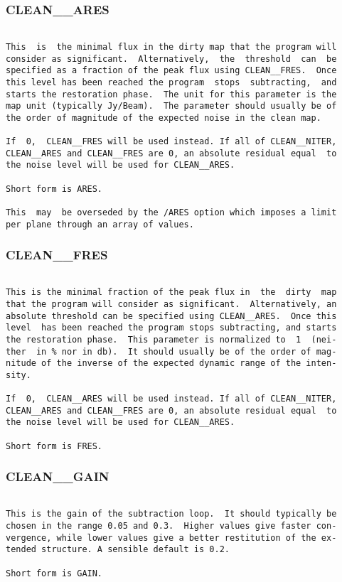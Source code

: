 \subsubsection{CLEAN\_\_ARES}
\begin{verbatim}

This  is  the minimal flux in the dirty map that the program will
consider as significant.  Alternatively,  the  threshold  can  be
specified as a fraction of the peak flux using CLEAN__FRES.  Once
this level has been reached the program  stops  subtracting,  and
starts the restoration phase.  The unit for this parameter is the
map unit (typically Jy/Beam).  The parameter should usually be of
the order of magnitude of the expected noise in the clean map.

If  0,  CLEAN__FRES will be used instead. If all of CLEAN__NITER,
CLEAN__ARES and CLEAN__FRES are 0, an absolute residual equal  to
the noise level will be used for CLEAN__ARES.

Short form is ARES.

This  may  be overseded by the /ARES option which imposes a limit
per plane through an array of values.

\end{verbatim}
\subsubsection{CLEAN\_\_FRES}
\begin{verbatim}

This is the minimal fraction of the peak flux in  the  dirty  map
that the program will consider as significant.  Alternatively, an
absolute threshold can be specified using CLEAN__ARES.  Once this
level  has been reached the program stops subtracting, and starts
the restoration phase.  This parameter is normalized to  1  (nei-
ther  in % nor in db).  It should usually be of the order of mag-
nitude of the inverse of the expected dynamic range of the inten-
sity.

If  0,  CLEAN__ARES will be used instead. If all of CLEAN__NITER,
CLEAN__ARES and CLEAN__FRES are 0, an absolute residual equal  to
the noise level will be used for CLEAN__ARES.

Short form is FRES.

\end{verbatim}
\subsubsection{CLEAN\_\_GAIN}
\begin{verbatim}

This is the gain of the subtraction loop.  It should typically be
chosen in the range 0.05 and 0.3.  Higher values give faster con-
vergence, while lower values give a better restitution of the ex-
tended structure. A sensible default is 0.2.

Short form is GAIN.

\end{verbatim}
